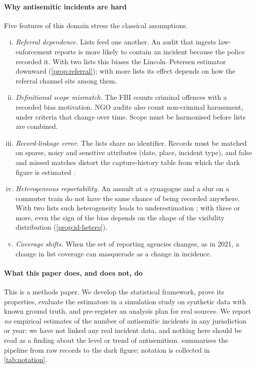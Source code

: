 \paragraph{Why antisemitic incidents are hard}
Five features of this domain stress the classical assumptions.
\begin{enumerate}[(i),leftmargin=2.2em]
  \item \emph{Referral dependence.} Lists feed one another. An audit that
  ingests law-enforcement reports is more likely to contain an incident
  because the police recorded it. With two lists this biases the
  Lincoln--Petersen estimator downward (\cref{prop:referral}); with more
  lists its effect depends on how the referral channel sits among them.
  \item \emph{Definitional scope mismatch.} The FBI counts criminal offences
  with a recorded bias motivation. NGO audits also count non-criminal
  harassment, under criteria that change over time. Scope must be harmonised
  before lists are combined.
  \item \emph{Record-linkage error.} The lists share no identifier. Records
  must be matched on sparse, noisy and sensitive attributes (date, place,
  incident type), and false and missed matches distort the capture-history
  table from which the dark figure is estimated \citep{ding1994}.
  \item \emph{Heterogeneous reportability.} An assault at a synagogue and a
  slur on a commuter train do not have the same chance of being recorded
  anywhere. With two lists such heterogeneity leads to underestimation
  \citep{chao1987}; with three or more, even the sign of the bias depends on
  the shape of the visibility distribution (\cref{prop:id-hetero}).
  \item \emph{Coverage shifts.} When the set of reporting agencies changes, as
  in 2021, a change in list coverage can masquerade as a change in incidence.
\end{enumerate}

\paragraph{What this paper does, and does not, do}
This is a methods paper. We develop the statistical framework, prove its
properties, evaluate the estimators in a simulation study on synthetic data
with known ground truth, and pre-register an analysis plan for real sources.
We report \emph{no} empirical estimates of the number of antisemitic incidents
in any jurisdiction or year: we have not linked any real incident data, and
nothing here should be read as a finding about the level or trend of
antisemitism.  summarises the pipeline from raw records to
the dark figure; notation is collected in \cref{tab:notation}.

